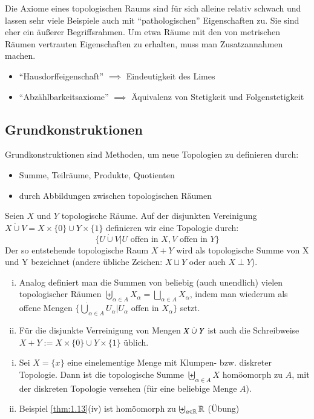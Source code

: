 \documentclass[a4paper,10pt]{scrartcl}
\begin{document}
\begin{note}
Die Axiome eines topologischen Raums sind für sich alleine relativ schwach und lassen sehr viele Beispiele auch mit "`pathologischen"' Eigenschaften zu. Sie sind eher ein äußerer Begriffsrahmen. Um etwa Räume mit den von metrischen Räumen vertrauten Eigenschaften zu erhalten, muss man Zusatzannahmen machen.
\begin{itemize}
  \item "`Hausdorffeigenschaft"' $\implies$ Eindeutigkeit des Limes
  \item "`Abzählbarkeitsaxiome"' $\implies$ Äquivalenz von Stetigkeit und Folgenstetigkeit
\end{itemize}
\end{note}
\subsection{Grundkonstruktionen}
Grundkonstruktionen sind Methoden, um neue Topologien zu definieren durch:
\begin{itemize}
\item Summe, Teilräume, Produkte, Quotienten
\item durch Abbildungen zwischen topologischen Räumen
\end{itemize}
\begin{df}
Seien $ X $ und $ Y $ topologische Räume. Auf der disjunkten Vereinigung $ X \mathbin{\dot{\cup}} V =X \times \{ 0 \} \cup Y \times \{1\}$ definieren wir eine Topologie durch:
\[
\{U \mathbin{\dot{\cup}} V| U \text{ offen in } X, V \text{ offen in } Y\}
\]
Der so entstehende topologische Raum $ X+Y $ wird als topologische Summe von X und Y bezeichnet (andere übliche Zeichen: $X \sqcup Y$ oder auch $X \perp Y$).
\end{df}
\begin{note*}
\begin{enumerate}[(i)]
\item Analog definiert man die Summen von beliebig (auch unendlich) vielen topologischer Räumen $\biguplus_{\alpha \in  A} X_\alpha=\bigsqcup_{\alpha\in A} X_\alpha$, indem man wiederum als offene Mengen $\{\dot \bigcup_{\alpha\in A} U_\alpha | U_\alpha \text{ offen in } X_\alpha \}$ setzt.
\item Für die disjunkte Verreinigung von Mengen $ X \mathbin{\dot{\cup}} Y $ ist auch die Schreibweise $X+Y:= X\times\{0\} \cup Y\times \{1\}$ üblich.  
\end{enumerate}
\end{note*}
\begin{ex*}
\begin{enumerate}[(i)]
\item Sei $ X=\{ x\} $ eine einelementige Menge mit Klumpen- bzw. diskreter Topologie. Dann ist die topologische Summe $ \biguplus_{\alpha\in A}X $ homöomorph zu $A$, mit der diskreten Topologie versehen (für eine beliebige Menge $A$). 
\item Beispiel \ref{thm:1.13}(iv) ist homöomorph zu $ \biguplus_{\alpha\in \mathbb{R}}  \mathbb{R} $ (Übung)
\end{enumerate}
\end{ex*}
\end{document}
